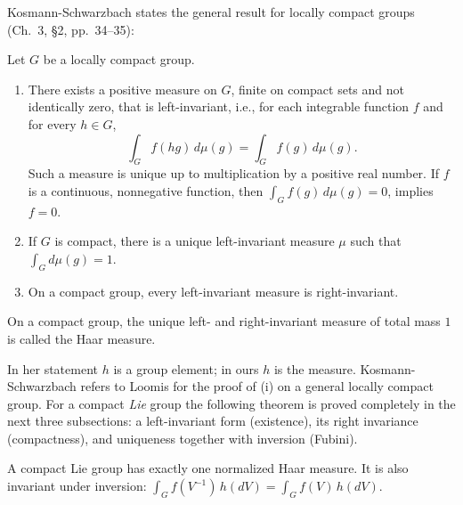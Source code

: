 Kosmann-Schwarzbach states the general result for locally compact groups
(Ch.~3, \S2, pp.~34--35):
\begin{theorem}\label{haar:thm:KS-2-1}
Let $G$ be a locally compact group.
\begin{enumerate}
\item[(i)] There exists a positive measure on $G$, finite on compact sets
and not identically zero, that is left-invariant, i.e., for each integrable
function $f$ and for every $h\in G$,
\[
 \int_G f(hg)\,d\mu(g)=\int_G f(g)\,d\mu(g).
\]
Such a measure is unique up to multiplication by a positive real number. If
$f$ is a continuous, nonnegative function, then $\int_G f(g)\,d\mu(g)=0$,
implies $f=0$.
\item[(ii)] If $G$ is compact, there is a unique left-invariant measure $\mu$
such that $\int_G d\mu(g)=1$.
\item[(iii)] On a compact group, every left-invariant measure is
right-invariant.
\end{enumerate}
\end{theorem}
\begin{definition}
On a compact group, the unique left- and right-invariant measure of total
mass $1$ is called the Haar measure.
\end{definition}
In her statement $h$ is a group element; in ours $h$ is the measure.
Kosmann-Schwarzbach refers to Loomis for the proof of (i) on a general
locally compact group. For a compact \emph{Lie} group the following
theorem is proved completely in the next three subsections: a
left-invariant form (existence), its right invariance (compactness), and
uniqueness together with inversion (Fubini).
\begin{theorem}\label{haar:thm:exist-unique}
A compact Lie group has exactly one normalized Haar measure. It is also
invariant under inversion: $\int_Gf(V^{-1})\,h(dV)=\int_Gf(V)\,h(dV)$.
\end{theorem}

